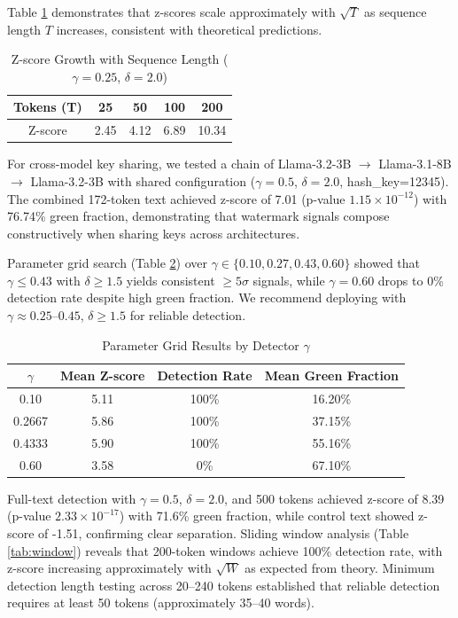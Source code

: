 \documentclass[12pt,letterpaper]{article}
\begin{document}
Table \ref{tab:seqlen} demonstrates that z-scores scale approximately with $\sqrt{T}$ as sequence length $T$ increases, consistent with theoretical predictions.

\begin{table}[H]
\centering
\caption{Z-score Growth with Sequence Length ($\gamma=0.25$, $\delta=2.0$)}
\label{tab:seqlen}
\begin{tabular}{ccccc}
\toprule
Tokens (T) & 25 & 50 & 100 & 200 \\
\midrule
Z-score & 2.45 & 4.12 & 6.89 & 10.34 \\
\bottomrule
\end{tabular}
\end{table}

For cross-model key sharing, we tested a chain of Llama-3.2-3B $\rightarrow$ Llama-3.1-8B $\rightarrow$ Llama-3.2-3B with shared configuration ($\gamma=0.5$, $\delta=2.0$, hash\_key=12345). The combined 172-token text achieved z-score of 7.01 (p-value $1.15 \times 10^{-12}$) with 76.74\% green fraction, demonstrating that watermark signals compose constructively when sharing keys across architectures.

Parameter grid search (Table \ref{tab:param}) over $\gamma \in \{0.10, 0.27, 0.43, 0.60\}$ showed that $\gamma \leq 0.43$ with $\delta \geq 1.5$ yields consistent $\geq 5\sigma$ signals, while $\gamma = 0.60$ drops to 0\% detection rate despite high green fraction. We recommend deploying with $\gamma \approx 0.25$--$0.45$, $\delta \geq 1.5$ for reliable detection.

\begin{table}[H]
\centering
\caption{Parameter Grid Results by Detector $\gamma$}
\label{tab:param}
\begin{tabular}{cccc}
\toprule
$\gamma$ & Mean Z-score & Detection Rate & Mean Green Fraction \\
\midrule
0.10 & 5.11 & 100\% & 16.20\% \\
0.2667 & 5.86 & 100\% & 37.15\% \\
0.4333 & 5.90 & 100\% & 55.16\% \\
0.60 & 3.58 & 0\% & 67.10\% \\
\bottomrule
\end{tabular}
\end{table}

Full-text detection with $\gamma=0.5$, $\delta=2.0$, and 500 tokens achieved z-score of 8.39 (p-value $2.33 \times 10^{-17}$) with 71.6\% green fraction, while control text showed z-score of -1.51, confirming clear separation. Sliding window analysis (Table \ref{tab:window}) reveals that 200-token windows achieve 100\% detection rate, with z-score increasing approximately with $\sqrt{W}$ as expected from theory. Minimum detection length testing across 20--240 tokens established that reliable detection requires at least 50 tokens (approximately 35--40 words).
\end{document}
